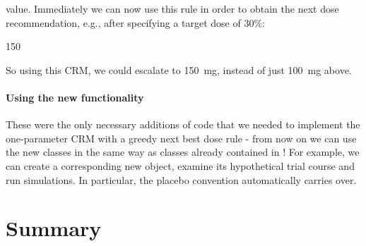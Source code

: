 \documentclass[article]{jss}\usepackage[]{graphicx}\usepackage[]{color}
\begin{document}
value. Immediately we can now use this rule in order to obtain the next dose 
recommendation, e.g., after specifying a target dose of 30\%:
\begin{Schunk}
\begin{Soutput}
[1] 150
\end{Soutput}
\end{Schunk}
So using this CRM, we could escalate to 150~mg, instead 
of just 100~mg above.

\paragraph{Using the new functionality} These were the only necessary additions
of code that we needed to implement the one-parameter CRM with a greedy next 
best dose rule - from now on we can use the new classes in the same way as
classes already contained in ! For example, we can create a 
corresponding new  object, examine its hypothetical trial course
and run simulations. In particular, the placebo convention automatically carries over.

\section{Summary}
\label{sec:discussion}
\end{document}
